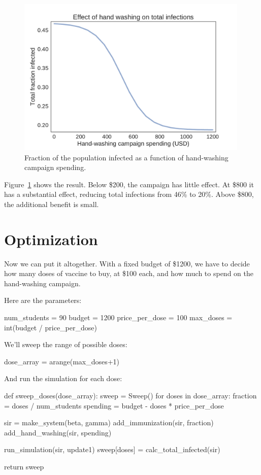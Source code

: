 \documentclass[12pt]{book}
\theoremstyle{exercise}
\begin{document}
\begin{figure}
\centerline{\includegraphics[height=3in]{figs/chap05-fig05.pdf}}
\caption{Fraction of the population infected as a function of hand-washing campaign spending.}
\label{chap05-fig05}
\end{figure} 

Figure~\ref{chap05-fig05} shows the result.  Below \$200, the campaign has little effect.  At \$800 it has a substantial effect, reducing total infections from 46\% to 20\%.  Above \$800, the additional benefit is small.

\section{Optimization} 

Now we can put it altogether.  With a fixed budget of \$1200, we have to decide how many doses of vaccine to buy, at \$100 each, and how much to spend on the hand-washing campaign.

Here are the parameters:

\begin{python}
num_students = 90
budget = 1200
price_per_dose = 100
max_doses = int(budget / price_per_dose)
\end{python}

We'll sweep the range of possible doses:

\begin{python}
dose_array = arange(max_doses+1)
\end{python}

And run the simulation for each dose:

\begin{python}
def sweep_doses(dose_array):
    sweep = Sweep()
    for doses in dose_array:
        fraction = doses / num_students
        spending = budget - doses * price_per_dose
        
        sir = make_system(beta, gamma)
        add_immunization(sir, fraction)
        add_hand_washing(sir, spending)
        
        run_simulation(sir, update1)
        sweep[doses] = calc_total_infected(sir)

    return sweep
\end{python}
\end{document}
